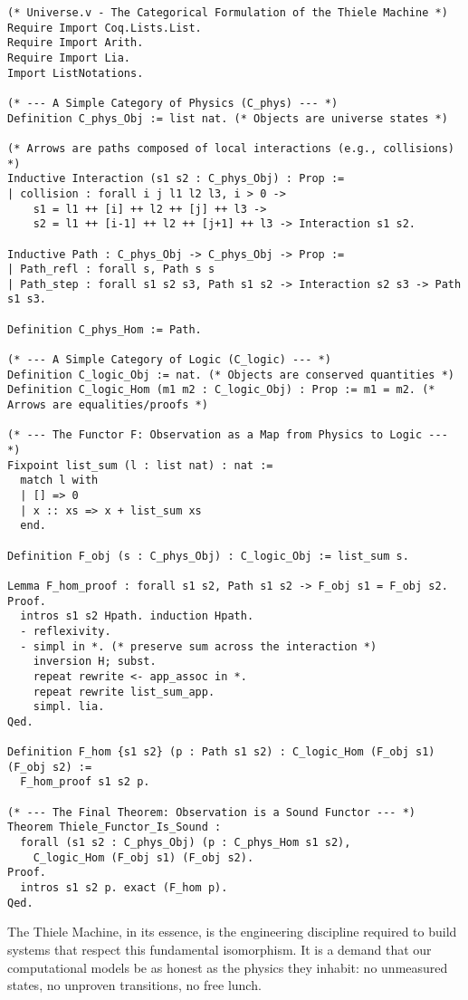 \documentclass[11pt]{article}
\begin{document}
\begin{verbatim}
(* Universe.v - The Categorical Formulation of the Thiele Machine *)
Require Import Coq.Lists.List.
Require Import Arith.
Require Import Lia.
Import ListNotations.

(* --- A Simple Category of Physics (C_phys) --- *)
Definition C_phys_Obj := list nat. (* Objects are universe states *)

(* Arrows are paths composed of local interactions (e.g., collisions) *)
Inductive Interaction (s1 s2 : C_phys_Obj) : Prop :=
| collision : forall i j l1 l2 l3, i > 0 ->
    s1 = l1 ++ [i] ++ l2 ++ [j] ++ l3 ->
    s2 = l1 ++ [i-1] ++ l2 ++ [j+1] ++ l3 -> Interaction s1 s2.

Inductive Path : C_phys_Obj -> C_phys_Obj -> Prop :=
| Path_refl : forall s, Path s s
| Path_step : forall s1 s2 s3, Path s1 s2 -> Interaction s2 s3 -> Path s1 s3.

Definition C_phys_Hom := Path.

(* --- A Simple Category of Logic (C_logic) --- *)
Definition C_logic_Obj := nat. (* Objects are conserved quantities *)
Definition C_logic_Hom (m1 m2 : C_logic_Obj) : Prop := m1 = m2. (* Arrows are equalities/proofs *)

(* --- The Functor F: Observation as a Map from Physics to Logic --- *)
Fixpoint list_sum (l : list nat) : nat :=
  match l with
  | [] => 0
  | x :: xs => x + list_sum xs
  end.

Definition F_obj (s : C_phys_Obj) : C_logic_Obj := list_sum s.

Lemma F_hom_proof : forall s1 s2, Path s1 s2 -> F_obj s1 = F_obj s2.
Proof.
  intros s1 s2 Hpath. induction Hpath.
  - reflexivity.
  - simpl in *. (* preserve sum across the interaction *)
    inversion H; subst.
    repeat rewrite <- app_assoc in *.
    repeat rewrite list_sum_app.
    simpl. lia.
Qed.

Definition F_hom {s1 s2} (p : Path s1 s2) : C_logic_Hom (F_obj s1) (F_obj s2) :=
  F_hom_proof s1 s2 p.

(* --- The Final Theorem: Observation is a Sound Functor --- *)
Theorem Thiele_Functor_Is_Sound :
  forall (s1 s2 : C_phys_Obj) (p : C_phys_Hom s1 s2),
    C_logic_Hom (F_obj s1) (F_obj s2).
Proof.
  intros s1 s2 p. exact (F_hom p).
Qed.
\end{verbatim}

The Thiele Machine, in its essence, is the engineering discipline required to build systems that respect this fundamental isomorphism. It is a demand that our computational models be as honest as the physics they inhabit: no unmeasured states, no unproven transitions, no free lunch.
\end{document}

